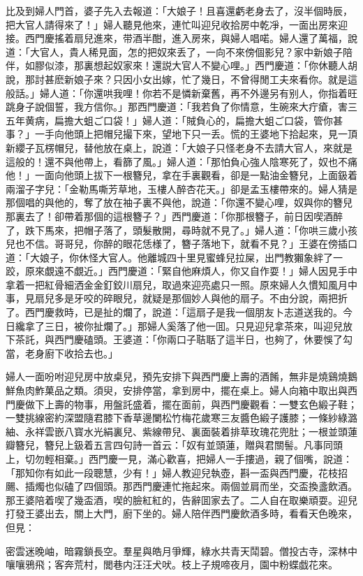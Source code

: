 比及到婦人門首，婆子先入去報道：「大娘子！且喜還虧老身去了，沒半個時辰，把大官人請得來了！」婦人聽見他來，連忙叫迎兒收拾房中乾凈，一面出房來迎接。西門慶搖着扇兒進來，带酒半酣，進入房來，與婦人唱喏。婦人還了萬福，說道：「大官人，貴人稀見面，怎的把奴來丢了，一向不來傍個影兒？家中新娘子陪伴，如膠似漆，那裏想起奴家來！還説大官人不變心哩。」西門慶道：「你休聽人胡說，那討甚麽新娘子來？只因小女出嫁，忙了幾日，不曾得閒工夫來看你。就是這般話。」婦人道：「你還哄我哩！你若不是憐新棄舊，再不外邊另有别人，你指着旺跳身子說個誓，我方信你。」那西門慶道：「我若負了你情意，生碗來大疔瘡，害三五年黄病，扁擔大蛆ご口袋！」婦人道：「賊負心的，扁擔大蛆ご口袋，管你甚事？」一手向他頭上把帽兒撮下來，望地下只一丢。慌的王婆地下拾起來，見一頂新纓子瓦楞帽兒，替他放在桌上，說道：「大娘子只怪老身不去請大官人，來就是這般的！還不與他帶上，看篩了風。」婦人道：「那怕負心強人陰寒死了，奴也不痛他！」一面向他頭上拔下一根簪兒，拿在手裏觀看，卻是一點油金簪兒，上面鈒着兩溜子字兒：「金勒馬嘶芳草地，玉樓人醉杏花天。」卻是孟玉樓帶來的。婦人猜是那個唱的與他的，奪了放在袖子裏不與他，說道：「你還不變心哩，奴與你的簪兒那裏去了！卻帶着那個的這根簪子？」西門慶道：「你那根簪子，前日因喫酒醉了，跌下馬來，把帽子落了，頭髮散開，尋時就不見了。」婦人道：「你哄三歲小孩兒也不信。哥哥兒，你醉的眼花恁様了，簪子落地下，就看不見？」王婆在傍插口道：「大娘子，你休怪大官人。他離城四十里見蜜蜂兒拉屎，出門教獺象絆了一跤，原來覷遠不覷近。」西門慶道：「緊自他麻煩人，你又自作耍！」婦人因見手中拿着一把紅骨細洒金金釘鉸川扇兒，取過來迎亮處只一照。原來婦人久慣知風月中事，見扇兒多是牙咬的碎眼兒，就疑是那個妙人與他的扇子。不由分說，兩把折了。西門慶救時，已是扯的爛了，說道：「這扇子是我一個朋友卜志道送我的。今日纔拿了三日，被你扯爛了。」那婦人奚落了他一囬。只見迎兒拿茶來，叫迎兒放下茶託，與西門慶磕頭。王婆道：「你兩口子聐聒了這半日，也夠了，休要悞了勾當，老身廚下收拾去也。」

婦人一面吩咐迎兒房中放桌兒，預先安排下與西門慶上壽的酒餚，無非是燒鷄燒鵝鮮魚肉鮓菓品之類。須臾，安排停當，拿到房中，擺在桌上。婦人向箱中取出與西門慶做下上壽的物事，用盤託盛着，擺在面前，與西門慶觀看：一雙玄色緞子鞋；一雙挑線密約深盟隨君膝下香草邊闌松竹梅花歲寒三友醬色緞子護膝；一條紗綠潞紬、永祥雲嵌八寳水光絹裏兒、紫線帶兒、裏面裝着排草玫瑰花兜肚；一根並頭蓮瓣簪兒，簪兒上鈒着五言四句詩一首云：「奴有並頭蓮，贈與君關髻。凡事同頭上，切勿輕相棄。」西門慶一見，滿心歡喜，把婦人一手摟過，親了個嘴，說道：「那知你有如此一段聰慧，少有！」婦人教迎兒執壺，斟一盃與西門慶，花枝招颺、插燭也似磕了四個頭。那西門慶連忙拖起來。兩個並肩而坐，交盃換盞飲酒。那王婆陪着喫了幾盃酒，喫的臉紅紅的，告辭囬家去了。二人自在取樂頑耍。迎兒打發王婆出去，關上大門，廚下坐的。婦人陪伴西門慶飲酒多時，看看天色晚來，但見：
\begin{myquote}
密雲迷晚岫，暗霧鎖長空。羣星與皓月爭輝，綠水共青天鬦碧。僧投古寺，深林中嚷嚷鴉飛；客奔荒村，閭巷内汪汪犬吠。枝上子規啼夜月，園中粉蝶戯花來。
\end{myquote}

